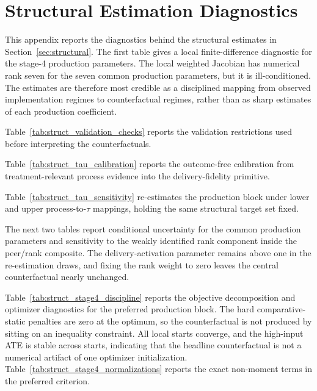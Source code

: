 \documentclass[11pt]{article}
\begin{document}
\section{Structural Estimation Diagnostics}
\label{app:struct_diagnostics}

This appendix reports the diagnostics behind the structural estimates in Section~\ref{sec:structural}. The first table gives a local finite-difference diagnostic for the stage-4 production parameters. The local weighted Jacobian has numerical rank seven for the seven common production parameters, but it is ill-conditioned. The estimates are therefore most credible as a disciplined mapping from observed implementation regimes to counterfactual regimes, rather than as sharp estimates of each production coefficient.

Table~\ref{tab:struct_validation_checks} reports the validation restrictions used before interpreting the counterfactuals.



Table~\ref{tab:struct_tau_calibration} reports the outcome-free calibration from treatment-relevant process evidence into the delivery-fidelity primitive.



Table~\ref{tab:struct_tau_sensitivity} re-estimates the production block under lower and upper process-to-$\tau$ mappings, holding the same structural target set fixed.





The next two tables report conditional uncertainty for the common production parameters and sensitivity to the weakly identified rank component inside the peer/rank composite. The delivery-activation parameter remains above one in the re-estimation draws, and fixing the rank weight to zero leaves the central counterfactual nearly unchanged.





Table~\ref{tab:struct_stage4_discipline} reports the objective decomposition and optimizer diagnostics for the preferred production block. The hard comparative-static penalties are zero at the optimum, so the counterfactual is not produced by sitting on an inequality constraint. All local starts converge, and the high-input ATE is stable across starts, indicating that the headline counterfactual is not a numerical artifact of one optimizer initialization. Table~\ref{tab:struct_stage4_normalizations} reports the exact non-moment terms in the preferred criterion.
\end{document}
